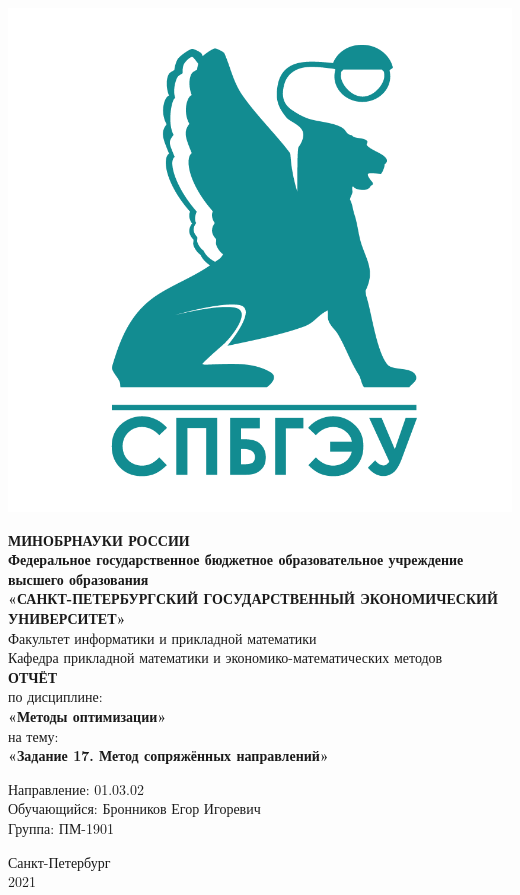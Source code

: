 \documentclass[14pt,a4paper,fleqn]{extarticle}
\begin{document}
	\begin{titlepage}
		\includegraphics[scale=0.12]{logo}
		\begin{center}
			\textbf{МИНОБРНАУКИ РОССИИ}\\
			\vspace{0.2cm}
			\textbf{Федеральное государственное бюджетное образовательное учреждение высшего образования}\\
			\textbf{«САНКТ-ПЕТЕРБУРГСКИЙ ГОСУДАРСТВЕННЫЙ ЭКОНОМИЧЕСКИЙ УНИВЕРСИТЕТ»}\\
			\vspace{0.6cm}
			Факультет информатики и прикладной математики\\
			Кафедра прикладной математики и экономико-математических методов\\
			\vspace{1cm}
			\textbf{ОТЧЁТ}\\
			по дисциплине:\\
			\textbf{«Методы оптимизации»}\\
			на тему:\\
			\textbf{«Задание 17. Метод сопряжённых направлений»}\\
		\end{center}
		\vspace{1cm}
		Направление: 01.03.02\\
		Обучающийся: Бронников Егор Игоревич\\
		Группа: ПМ-1901\\
		\vfill
		\begin{center}
			Санкт-Петербург\\
			2021\\
		\end{center}
	\end{titlepage}
\end{document}
